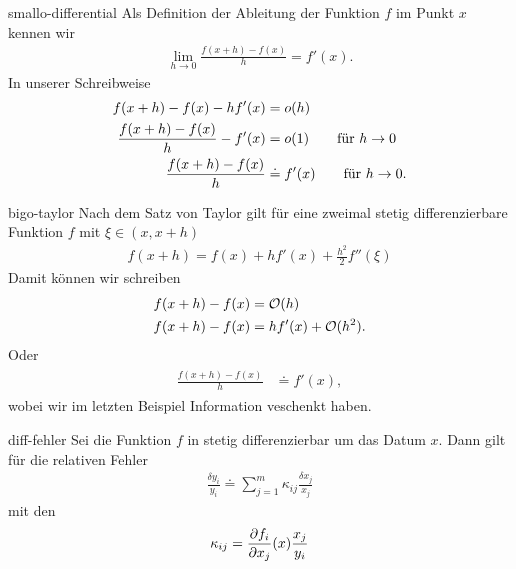 \begin{Beispiel}{smallo-differential}
  Als Definition der Ableitung der Funktion $f$ im Punkt $x$ kennen wir
  \begin{gather}
    \lim\limits_{h\to 0}\frac{f(x+h)-f(x)}{h} = f'(x).
  \end{gather}
  In unserer Schreibweise
  \begin{gather}
    \begin{split}
      f(x+h)-f(x) - h f'(x) &= o(h)\\
      \frac{f(x+h)-f(x)}{h} - f'(x) &= o(1)
      \qquad\text{für } h\to 0\\
      \frac{f(x+h)-f(x)}{h}  &\doteq f'(x)
      \qquad\text{für } h\to 0.
    \end{split}
  \end{gather}
\end{Beispiel}

\begin{Beispiel}{bigo-taylor}
  Nach dem Satz von Taylor gilt für eine zweimal stetig
  differenzierbare Funktion $f$ mit $\xi\in(x,x+h)$
  \begin{gather}
 f(x+h) = f(x) + h f'(x) + \tfrac{h^2}{2} f''(\xi)   
\end{gather}
Damit können wir schreiben
\begin{gather}
  \begin{split}
    f(x+h)-f(x) &= \mathcal O(h)\\
    f(x+h)-f(x) &=  h f'(x) + \mathcal O(h^2).
  \end{split}
\end{gather}
Oder
\begin{gather}
  \begin{split}
    \frac{f(x+h)-f(x)}h &\doteq f'(x),
  \end{split}
\end{gather}
wobei wir im letzten Beispiel Information veschenkt haben.
\end{Beispiel}

\begin{Lemma}{diff-fehler}
  Sei die Funktion $f$ in  stetig
  differenzierbar um das Datum $x$. Dann gilt für die relativen Fehler
  \begin{gather*}
    \frac{\delta y_i}{y_i}
    \doteq \sum_{j=1}^m \kappa_{ij}\frac{\delta x_j}{x_j}
  \end{gather*}
  mit den 
  \begin{gather}
    \kappa_{ij} = \frac{\partial f_i}{\partial x_j}(x)
    \frac{x_j}{y_i}
  \end{gather}
\end{Lemma}

